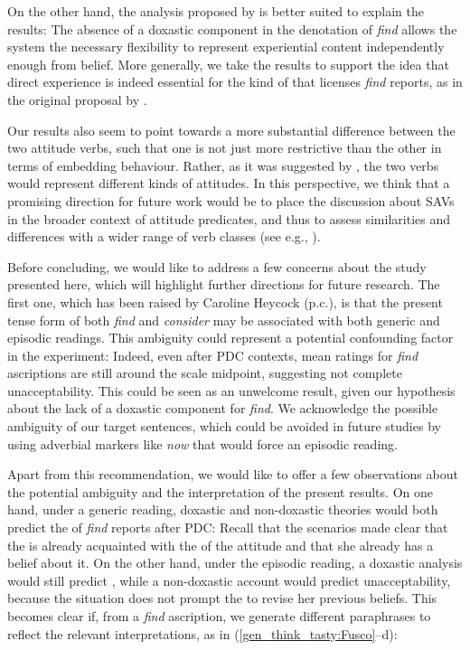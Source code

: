 \documentclass[output=paper,colorlinks,citecolor=brown]{langscibook}
\begin{document}
On the other hand, the analysis proposed by \citet{munoz2019} is better suited to explain the results: The absence of a doxastic component in the denotation of \textit{find} allows the system the necessary flexibility to represent experiential content independently enough from belief. More generally, we take the results to support the idea that direct experience is indeed essential for the kind of  that licenses \textit{find} reports, as in the original proposal by \citet{stephenson_thesis_2007}.

Our results also seem to point towards a more substantial difference between the two attitude verbs, such that one is not just more restrictive than the other in terms of embedding behaviour. Rather, as it was suggested by \citet{stojanovic_mcnally2023}, the two verbs would represent different kinds of attitudes. In this perspective, we think that a promising direction for future work would be to place the discussion about SAVs in the broader context of attitude predicates, and thus to assess similarities and differences with a wider range of verb classes (see e.g., \cite{anand_hacquard_2013epistemics}).

Before concluding, we would like to address a few concerns about the study presented here, which will highlight further directions for future research. The first one, which has been raised by Caroline Heycock (p.c.), is that the present tense form of both \textit{find} and \textit{consider} may be associated with both generic and episodic readings. This ambiguity could represent a potential confounding factor in the experiment: Indeed, even after PDC contexts, mean ratings for \textit{find} ascriptions are still around the scale midpoint, suggesting not complete unacceptability. This could be seen as an unwelcome result, given our hypothesis about the lack of a doxastic component for \textit{find}. We acknowledge the possible ambiguity of our target sentences, which could be avoided in future studies by using adverbial markers like \textit{now} that would force an episodic reading.

Apart from this recommendation, we would like to offer a few observations about the potential ambiguity and the interpretation of the present results. On one hand, under a generic reading,  doxastic and non-doxastic theories would both predict the  of \textit{find} reports after PDC: Recall that the scenarios made clear that the  is already acquainted with the  of the attitude and that she already has a belief about it. On the other hand, under the episodic reading, a doxastic analysis would still predict , while a non-doxastic account would predict unacceptability, because the situation does not prompt the  to revise her previous beliefs. This becomes clear if, from a \textit{find} ascription, we generate different paraphrases to reflect the relevant interpretations, as in (\ref{gen_think_tasty:Fusco}--d):
\end{document}
